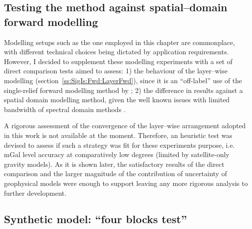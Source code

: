 
\FloatBarrier

\cleardoublepage
\begin{subappendices}
\section[Testing the method against spatial--domain forward modelling]{Testing the method against spatial--domain forward modelling}
\label{s:SigIs:Test}

Modelling setups such as the one employed in this chapter are commonplace, with different technical choices being dictated by application requirements.
However, I decided to supplement these modelling experiments with a set of direct comparison tests aimed to assess:
1) the behaviour of the layer--wise modelling (section~\ref{ss:SigIs:Fwd:LayerFwd}), since it is an ``off-label'' use of the single-relief forward modelling method by \textcite{Wieczorek2007};
2) the difference in results against a spatial domain modelling method, given the well known issues with limited bandwidth of spectral domain methods \parencite{Hirt2014}.

A rigorous assessment of the convergence of the layer--wise arrangement adopted in this work is not available at the moment.
Therefore, an heuristic test was devised to assess if such a strategy was fit for these experiments purpose, i.e. \si{\milli Gal} level accuracy at comparatively low degrees (limited by satellite-only gravity models).
As it is shown later, the satisfactory results of the direct comparison and the larger magnitude of the contribution of uncertainty of geophysical models were enough to support leaving any more rigorous analysis to further development.

\subsection{Synthetic model: ``four blocks test''}
\label{ss:SigIs:Test:FourBlocks}


\end{subappendices}
